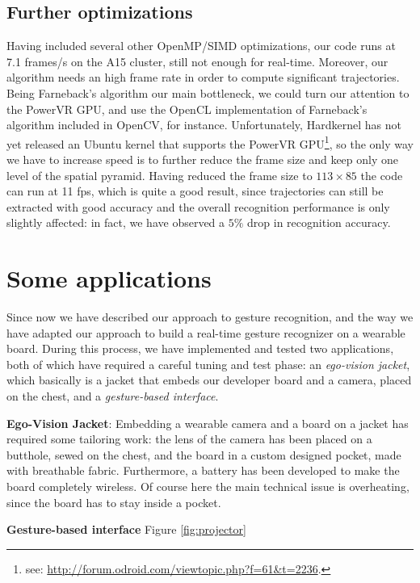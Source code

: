 \subsection{Further optimizations}
Having included several other OpenMP/SIMD optimizations, our code runs at 7.1 frames/s on the A15 cluster, still not enough for real-time. Moreover, our algorithm needs an high frame rate in order to compute significant trajectories. Being Farneback's algorithm our main bottleneck, we could turn our attention to the PowerVR GPU, and use the OpenCL implementation of Farneback's algorithm included in OpenCV, for instance. Unfortunately, Hardkernel has not yet released an Ubuntu kernel that supports the PowerVR GPU\footnote{see: \url{http://forum.odroid.com/viewtopic.php?f=61&t=2236}.}, so the only way we have to increase speed is to further reduce the frame size and keep only one level of the spatial pyramid. Having reduced the frame size to $113\times 85$ the code can run at 11 fps, which is quite a good result, since trajectories can still be extracted with good accuracy and the overall recognition performance is only slightly affected: in fact, we have observed a $5\%$ drop in recognition accuracy.

\section{Some applications}
Since now we have described our approach to gesture recognition, and the way we have adapted our approach to build a real-time gesture recognizer on a wearable board. During this process, we have implemented and tested two applications, both of which have required a careful tuning and test phase: an \textit{ego-vision jacket}, which basically is a jacket that embeds our developer board and a camera, placed on the chest, and a \textit{gesture-based interface}.

\textbf{Ego-Vision Jacket}: Embedding a wearable camera and a board on a jacket has required some tailoring work: the lens of the camera has been placed on a butthole, sewed on the chest, and the board in a custom designed pocket, made with breathable fabric. Furthermore, a battery has been developed to make the board completely wireless. Of course here the main technical issue is overheating, since the board has to stay inside a pocket.


\textbf{Gesture-based interface}
Figure \ref{fig:projector}

